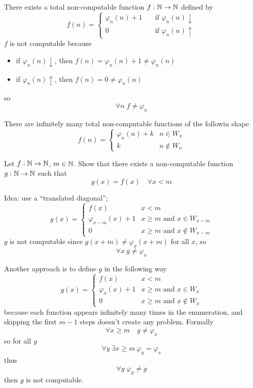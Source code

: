 \begin{observation}
  There exists a total non-computable function $f : \mathbb{N} \to \mathbb{N}$ defined by
  \[
    f(n) = \begin{cases}

      \varphi_n(n) + 1 & \quad \mbox{if } \varphi_n(n) \downarrow  \\

       0 & \quad \mbox{if } \varphi_n(n)\uparrow 
    \end{cases}
  \]
  $f$ is not computable because
  \begin{itemize}
    \item if $\varphi_n(n) \downarrow$, then $f(n) = \varphi_n(n) + 1 \neq \varphi_n(n) $
    \item if $\varphi_n(n)\uparrow$, then $f(n) = 0 \neq \varphi_n(n)$
  \end{itemize}
  so \[\forall n \; f \neq \varphi_n\]
\end{observation}


\begin{observation}
  There are infinitely many total non-computable
functions of the followin shape
\[
  f(n)  = \begin{cases}
    \varphi_n(n) + k & n \in W_n \\
    k & n \notin W_n
  \end{cases}
\]

\end{observation}

\begin{exercise}
  Let $f: \mathbb{N} \rightarrow \mathbb{N}$, $m \in \mathbb{N}$.
  Show that there exists a non-computable function $g : \mathbb{N} \rightarrow \mathbb{N}$ 
  such that \[g(x) = f(x) \quad \forall x < m\]

  Idea: use a ``translated diagonal'';
  \[
    g(x) = \begin{cases}
      f(x) & x < m \\
      \varphi_{x - m}(x) + 1 & x \geq m \mbox{ and } x \in W_{x-m} \\
      0 & x \geq m \mbox{ and } x \notin W_{x-m}
    \end{cases}
  \]
  $g$ is not computable since
  $g(x + m) \neq \varphi_x(x+m)$ for all $x$, so
  \[\forall x \ g\neq \varphi_x\]

  Another approach is to define $g$ in the following way
  \[
    g(x) = \begin{cases}
      f(x) & x < m \\
      \varphi_x(x) + 1 & x \geq m \mbox{ and } x \in W_{x} \\
      0 & x \geq m \mbox{ and } x \notin W_{x}
    \end{cases}
  \]
  because each function appears infinitely many times in the enumeration,
  and skipping the first $m-1$ steps doesn't create any
  problem. Formally
  \[
    \forall x \geq m \quad g \neq \varphi_x
    \]
    so for all $y$
  \[
    \forall y\ \exists x \geq m \ \varphi_y = \varphi_x
  \]
    thus \[
      \forall y \; \varphi_y \neq g
      \]
  then $g$ is not computable.
\end{exercise}

